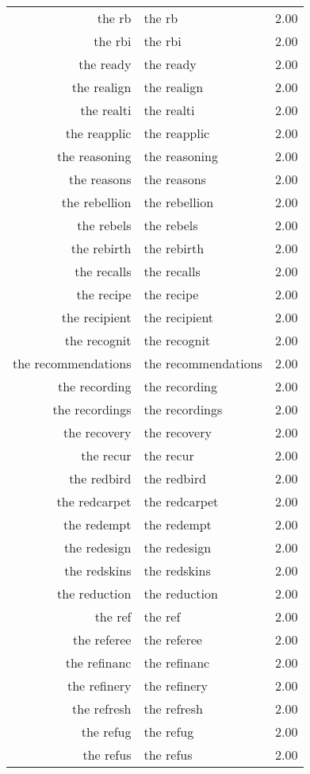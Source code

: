 \begin{table}[ht]
\begin{tabular}{rlr}
  the rb & the rb & 2.00 \\ 
  the rbi & the rbi & 2.00 \\ 
  the ready & the ready & 2.00 \\ 
  the realign & the realign & 2.00 \\ 
  the realti & the realti & 2.00 \\ 
  the reapplic & the reapplic & 2.00 \\ 
  the reasoning & the reasoning & 2.00 \\ 
  the reasons & the reasons & 2.00 \\ 
  the rebellion & the rebellion & 2.00 \\ 
  the rebels & the rebels & 2.00 \\ 
  the rebirth & the rebirth & 2.00 \\ 
  the recalls & the recalls & 2.00 \\ 
  the recipe & the recipe & 2.00 \\ 
  the recipient & the recipient & 2.00 \\ 
  the recognit & the recognit & 2.00 \\ 
  the recommendations & the recommendations & 2.00 \\ 
  the recording & the recording & 2.00 \\ 
  the recordings & the recordings & 2.00 \\ 
  the recovery & the recovery & 2.00 \\ 
  the recur & the recur & 2.00 \\ 
  the redbird & the redbird & 2.00 \\ 
  the redcarpet & the redcarpet & 2.00 \\ 
  the redempt & the redempt & 2.00 \\ 
  the redesign & the redesign & 2.00 \\ 
  the redskins & the redskins & 2.00 \\ 
  the reduction & the reduction & 2.00 \\ 
  the ref & the ref & 2.00 \\ 
  the referee & the referee & 2.00 \\ 
  the refinanc & the refinanc & 2.00 \\ 
  the refinery & the refinery & 2.00 \\ 
  the refresh & the refresh & 2.00 \\ 
  the refug & the refug & 2.00 \\ 
  the refus & the refus & 2.00 \\ 

\end{tabular}
\end{table}
